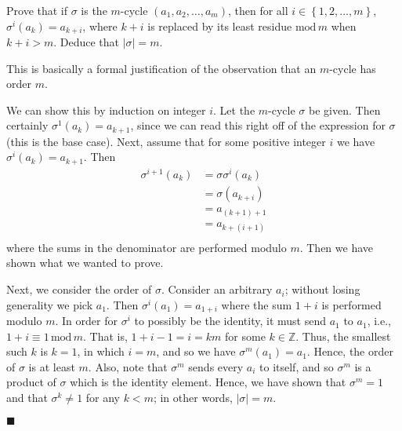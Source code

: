 \documentclass[12pt]{article}
\renewcommand{\qed}{\hfill$\blacksquare$}
\renewenvironment{proof}{\begin{addmargin}[1em]{0em}\begin{newproof}}{\end{newproof}\end{addmargin}\qed}
\newenvironment{problem}[2][Exercise]{\begin{trivlist}
\item[\hskip \labelsep {\bfseries #1}\hskip \labelsep {\bfseries #2.}]}{\end{trivlist}}
\begin{document}
\begin{problem}{1.3.10}
Prove that if $\sigma$ is the $m$-cycle $\left(a_1,a_2,\ldots,a_m\right)$, then for all $i\in \left\{1,2,\ldots,m\right\}$, $\sigma^i\left(a_k\right)=a_{k+i}$, where $k+i$ is replaced by its least residue $\text{mod}\, m$ when $k+i > m$. Deduce that $\left|\sigma\right|=m$.
\end{problem}
{\color{red} This is basically a formal justification of the observation that an $m$-cycle has order $m$.}
\begin{proof}
We can show this by induction on integer $i$. Let the $m$-cycle $\sigma$ be given. Then certainly $\sigma^1\left(a_k\right) = a_{k+1}$, since we can read this right off of the expression for $\sigma$ (this is the base case). Next, assume that for some positive integer $i$ we have $\sigma^i\left(a_k\right)=a_{k+1}$. Then
\begin{equation*}
    \begin{split}
        \sigma^{i+1}\left(a_k\right) & = \sigma \sigma^i \left(a_k\right) \\
        & = \sigma\left(a_{k+i}\right) \\
        & = a_{\left(k+1\right)+1} \\
        & = a_{k+\left(i+1\right)} \\
    \end{split}
\end{equation*}
where the sums in the denominator are performed modulo $m$. Then we have shown what we wanted to prove.

Next, we consider the order of $\sigma$. Consider an arbitrary $a_i$; without losing generality we pick $a_1$. Then $\sigma^{i}\left(a_1\right) = a_{1+i}$ where the sum $1+i$ is performed modulo $m$. In order for $\sigma^i$ to possibly be the identity, it must send $a_1$ to $a_1$, i.e., $1+i \equiv 1 \, \text{mod}\, m$. That is, $1+i-1 = i = km $ for some $k\in \mathbb{Z}$. Thus, the smallest such $k$ is $k=1$, in which $i=m$, and so we have $\sigma^m\left(a_1\right)=a_1$. Hence, the order of $\sigma$ is at least $m$. Also, note that $\sigma^m$ sends every $a_i$ to itself, and so $\sigma^m$ is a product of $\sigma$ which is the identity element. Hence, we have shown that $\sigma^m = 1$ and that $\sigma^k \neq 1$ for any $k<m$; in other words, $\left|\sigma\right|=m$.
\end{proof}
\end{document}
